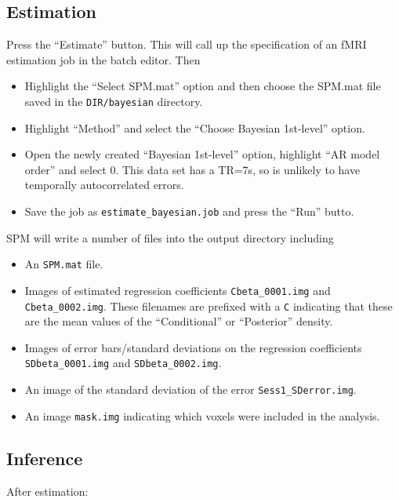 \subsection{Estimation}

Press the ``Estimate'' button. This will call up the specification of an fMRI estimation job in the batch editor. Then

\begin{itemize}
\item Highlight the ``Select SPM.mat'' option and then choose the SPM.mat file saved in the \texttt{DIR/bayesian} directory.
\item Highlight ``Method'' and select the ``Choose Bayesian 1st-level'' option.
\item Open the newly created ``Bayesian 1st-level'' option, highlight ``AR model order'' and select 0. This data set has a TR=7s, so is unlikely to have temporally autocorrelated errors.
\item Save the job as \texttt{estimate\_bayesian.job} and press the ``Run'' butto.
\end{itemize}

SPM will write a number of files into the output directory including 

\begin{itemize}
\item An \texttt{SPM.mat} file.
\item Images of estimated regression coefficients  \texttt{Cbeta\_0001.img} and \texttt{Cbeta\_0002.img}. These filenames are prefixed with a \texttt{C} indicating that these are the mean values of the ``Conditional'' or ``Posterior'' density.
\item Images of error bars/standard deviations on the regression coefficients \texttt{SDbeta\_0001.img} and \texttt{SDbeta\_0002.img}.
\item An image of the standard deviation of the error \texttt{Sess1\_SDerror.img}.
\item An image \texttt{mask.img} indicating which voxels were included in the analysis.
\end{itemize}

\subsection{Inference}

After estimation:

